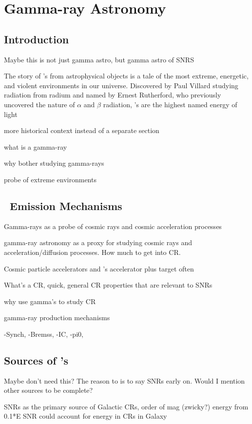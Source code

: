 \chapter{Gamma-ray Astronomy }
\label{chap:gamAstr}

\section{Introduction}\label{gamAstr:intro}
Maybe this is not just gamma astro, but gamma astro of SNRS

The story of \gam 's from astrophysical objects is a tale of the most extreme, energetic, and violent environments in our universe. Discovered by Paul Villard studying radiation from radium and named by Ernest Rutherford, who previously uncovered the nature of $\alpha$ and $\beta$ radiation, \gam's are the highest named energy of light 

more historical context instead of a separate section


what is a gamma-ray

why bother studying gamma-rays

probe of extreme environments



\section{\gam~Emission Mechanisms }\label{gamAstr:CR}
Gamma-rays as a probe of cosmic rays and cosmic acceleration processes

gamma-ray astronomy as  a proxy for studying cosmic rays and acceleration/diffusion processes. How much to get into CR. 

Cosmic particle accelerators and \gam's
accelerator plus target often 


What's a CR, quick,  general CR properties that are relevant to SNRs

why use gamma's  to study CR

gamma-ray production mechanisms

-Synch,
-Bremss,
-IC,
-pi0,

\section{Sources of \gam's}\label{gamAstr:Sources}
Maybe don't need this? The reason to is to say SNRs early on. Would I mention other sources to be complete?

SNRs as the primary source of Galactic CRs, order of mag (zwicky?) energy from 0.1*E SNR could account for energy in CRs in Galaxy

